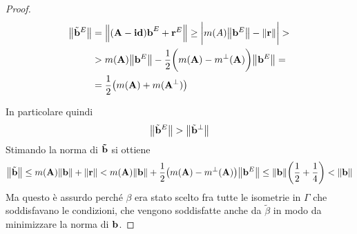 \documentclass[a4paper,11pt,openright,twoside	]{book}
\begin{document}
\begin{proof}
\begin{equation}
\label{eq:e}
\begin{split}
	\norm{\tilde{\vb{b}}^{E} } & = \norm{(\vb{A-id) b}^{E} + \vb{r}^{E}} \geq \bigg| m(A) \norm{\vb{b}^E} - \norm{\vb{r}}\bigg| > \\
	& > m(\vb{A}) \norm{\vb{b}^E} - \frac{1}{2} \bigg( m(\vb{A}) - m^{\perp}(\vb{A})\bigg)\norm{\vb{b}^E} = \\
	& = \frac{1}{2} \big( m(\vb{A}) + m(\vb{A}^{\perp}) \big)
\end{split}
\end{equation}

In particolare quindi 
\[ \norm{\tilde{\vb{b}}^{E}} > \norm{\tilde{\vb{b}}^{\perp}}\]
Stimando la norma di $\vb{\tilde{b}}$ si ottiene 
\[ \norm{\tilde{\vb{b}}} \leq m(\vb{A}) \norm{\vb{b}} + \norm{\vb{r}} < m(\vb{A})\norm{\vb{b}} + \frac{1}{2} \big( m(\vb{A}) - m^{\perp}(\vb{A}) \big)\norm{\vb{b}^{E}} \leq  \norm{\vb{b}} \bigg( \frac{1}{2} + \frac{1}{4}\bigg) < \norm{\vb{b}} \]
Ma questo è assurdo perché $\beta$ era stato scelto fra tutte le isometrie in $\Gamma$ che soddisfavano le condizioni, che vengono soddisfatte anche da $\tilde{\beta}$  in modo da minimizzare la norma di $\vb{b}$.
\end{proof}
\end{document}

